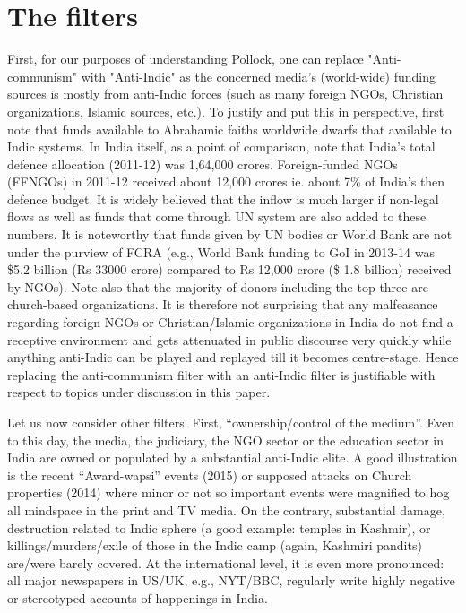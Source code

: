 \section*{The filters}

First, for our purposes of understanding Pollock, one can replace "Anti-communism" with "Anti-Indic" as the concerned media’s (world-wide) funding sources is mostly from anti-Indic forces (such as many foreign NGOs, Christian organizations, Islamic sources, etc.). To justify and put this in perspective, first note that funds available to Abrahamic faiths worldwide dwarfs that available to Indic systems. In India itself, as a point of comparison, note that India’s total defence allocation (2011-12) was 1,64,000 crores. Foreign-funded NGOs (FFNGOs) in 2011-12 received about 12,000 crores ie. about 7\% of India's then defence budget. It is widely believed that the inflow is much larger if non-legal flows as well as funds that come through UN system are also added to these numbers. It is noteworthy that funds given by UN bodies or World Bank are not under the purview of FCRA (e.g., World Bank funding to GoI in 2013-14 was \$5.2 billion (Rs 33000 crore) compared to Rs 12,000 crore (\$ 1.8 billion) received by NGOs). Note also that the majority of donors including the top three are church-based organizations. It is therefore not surprising that any malfeasance regarding foreign NGOs or Christian/Islamic organizations in India do not find a receptive environment and gets attenuated in public discourse very quickly while anything anti-Indic can be played and replayed till it becomes centre-stage. Hence replacing the anti-communism filter with an anti-Indic filter is justifiable with respect to topics under discussion in this paper.

Let us now consider other filters. First, “ownership/control of the medium”. Even to this day, the media, the judiciary, the NGO sector or the education sector in India are owned or populated by a substantial anti-Indic elite. A good illustration is the recent “Award-wapsi” events (2015) or supposed attacks on Church properties (2014) where minor or not so important events were magnified to hog all mindspace in the print and TV media.  On the contrary, substantial damage, destruction related to Indic sphere (a good example: temples in Kashmir), or killings/murders/exile of those in the Indic camp (again, Kashmiri pandits) are/were barely covered. At the international level, it is even more pronounced: all major newspapers in US/UK, e.g., NYT/BBC, regularly write highly negative or stereotyped accounts of happenings in India.

